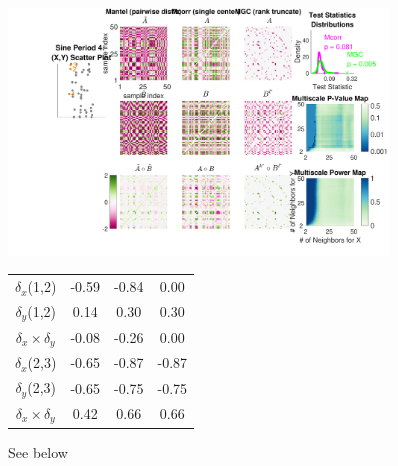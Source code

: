 \documentclass[11pt]{article}
\newcommand{\note}[2][]{\added[#1,remark={#2}]{}}
\newcommand{\cs}[1]{{\note{cs: #1}}}
\begin{document}
\begin{figure}[htbp]
\includegraphics[width=0.9\textwidth,trim={5cm 0 0 0},clip]{../Figures/FigA}
\begin{center}
\begin{tabular}{c  c  c  c}
 $\delta_x$(1,2) & \hspace{1.8em} -0.59 \hspace{1.8em}  & \hspace{1.8em} -0.84 \hspace{1.8em} & \hspace{1.8em} 0.00 \hspace{1.8em}  \\ 
 $\delta_y$(1,2) & 0.14 & 0.30 & 0.30  \\ 
 $\delta_x \times \delta_y$ & -0.08 & -0.26 & 0.00  \\ 
 
\hline


 $\delta_x$(2,3) & -0.65 & -0.87 & -0.87  \\ 
 $\delta_y$(2,3) & -0.65 & -0.75 & -0.75  \\ 
 $\delta_x \times \delta_y$ & 0.42 & 0.66 & 0.66  \\ 
\end{tabular}
\cs{can you color code this table? maybe just using two colors to denote positive and negative?
also, do we want another row, that shows the sum across the $\delta_x \times \delta_y$ values?}
\end{center}
\caption{See below}
\label{f:schematic}
\end{figure}
%
\clearpage
\end{document}

